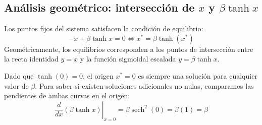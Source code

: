 \subsection{Análisis geométrico: intersección de $x$ y $\beta\tanh x$}

Los puntos fijos del sistema satisfacen la condición de equilibrio:
\begin{equation}
    -x + \beta \tanh x = 0 \iff x^* = \beta \tanh(x^*)
    \label{eq:interseccion_neurona}
\end{equation}
Geométricamente, los equilibrios corresponden a los puntos de intersección entre la recta identidad $y = x$ y la función sigmoidal escalada $y = \beta \tanh x$.

Dado que $\tanh(0) = 0$, el origen $x^* = 0$ es siempre una solución para cualquier valor de $\beta$. Para saber si existen soluciones adicionales no nulas, comparamos las pendientes de ambas curvas en el origen:
\begin{equation}
    \left.\frac{d}{dx}(\beta \tanh x)\right|_{x=0} = \beta \operatorname{sech}^2(0) = \beta (1) = \beta
\end{equation}


